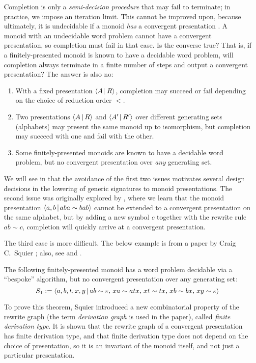 \documentclass[../generics]{subfiles}
\begin{document}
Completion is only a \emph{semi-decision procedure} that may fail to terminate; in practice, we impose an iteration limit. This cannot be improved upon, because ultimately, it is undecidable if a monoid \emph{has} a convergent presentation \cite{ODUNLAING1983339}. A monoid with an undecidable word problem cannot have a convergent presentation, so completion must fail in that case. Is the converse true? That is, if a finitely-presented monoid is known to have a decidable word problem, will completion always terminate in a finite number of steps and output a convergent presentation? The answer is also no:
\begin{enumerate}
\item With a fixed presentation $\langle A\,|\,R\rangle$, completion may succeed or fail depending on the choice of reduction order $<$.
\item Two presentations $\langle A\,|\,R\rangle$ and $\langle A^\prime\,|\,R^\prime\rangle$ over different generating sets (alphabets) may present the same monoid up to isomorphism, but completion may succeed with one and fail with the other.
\item Some finitely-presented monoids are known to have a decidable word problem, but no convergent presentation over \emph{any} generating set.
\end{enumerate}
We will see in  that the avoidance of the first two issues motivates several design decisions in the lowering of generic signatures to monoid presentations. The second issue was originally explored by \cite{KAPUR1985337}, where we learn that the monoid presentation $\langle a,b\,|\,aba\sim bab\rangle$ cannot be extended to a convergent presentation on the same alphabet, but by adding a new symbol $c$ together with the rewrite rule $ab\sim c$, completion will quickly arrive at a convergent presentation.

The third case is more difficult. The below example is from a paper by Craig C.~Squier \cite{SQUIER1994271}; also, see \cite{Lafont1991ChurchRooserPA} and \cite{LAFONT1995229}.
\begin{theorem}\label{squier s1} The following finitely-presented monoid has a word problem decidable via a ``bespoke'' algorithm, but no convergent presentation over any generating set:
\[S_1:=\langle a,b,t,x,y\,|\,ab\sim \varepsilon,\,xa\sim atx,\,xt\sim tx,\,xb\sim bx,\,xy\sim \varepsilon\rangle\]
\end{theorem}
To prove this theorem, Squier introduced a new combinatorial property of the rewrite graph (the term \emph{derivation graph} is used in the paper), called \emph{finite derivation type}. It is shown that the rewrite graph of a convergent presentation has finite derivation type, and that finite derivation type does not depend on the choice of presentation, so it is an invariant of the monoid itself, and not just a particular presentation.
\end{document}
